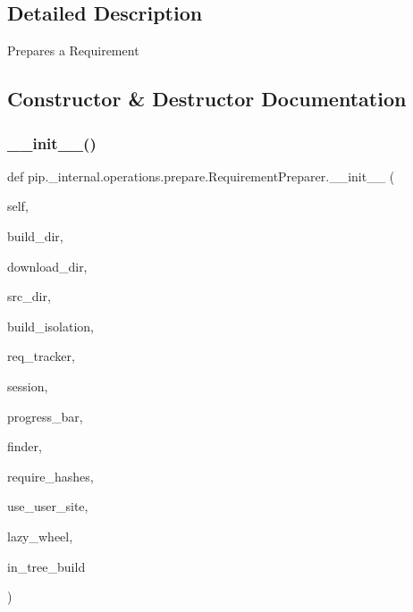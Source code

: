 \subsection{Detailed Description}
\begin{DoxyVerb}Prepares a Requirement
\end{DoxyVerb}
 

\subsection{Constructor \& Destructor Documentation}
\mbox{\label{classpip_1_1__internal_1_1operations_1_1prepare_1_1RequirementPreparer_a390b7e66c9cfd61960ffbdb1b51b3340}} 
\subsubsection{\texorpdfstring{\+\_\+\+\_\+init\+\_\+\+\_\+()}{\_\_init\_\_()}}
{\footnotesize\ttfamily def pip.\+\_\+internal.\+operations.\+prepare.\+Requirement\+Preparer.\+\_\+\+\_\+init\+\_\+\+\_\+ (\begin{DoxyParamCaption}\item[{}]{self,  }\item[{}]{build\+\_\+dir,  }\item[{}]{download\+\_\+dir,  }\item[{}]{src\+\_\+dir,  }\item[{}]{build\+\_\+isolation,  }\item[{}]{req\+\_\+tracker,  }\item[{}]{session,  }\item[{}]{progress\+\_\+bar,  }\item[{}]{finder,  }\item[{}]{require\+\_\+hashes,  }\item[{}]{use\+\_\+user\+\_\+site,  }\item[{}]{lazy\+\_\+wheel,  }\item[{}]{in\+\_\+tree\+\_\+build }\end{DoxyParamCaption})}



